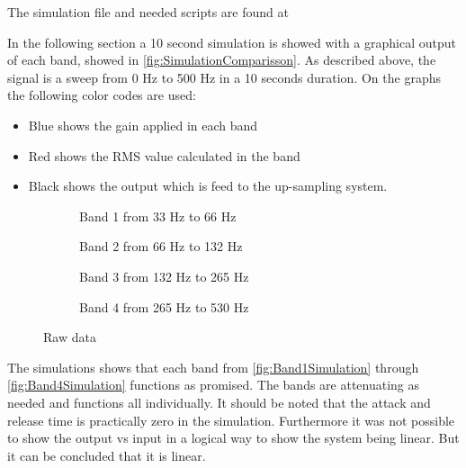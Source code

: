 The simulation file and needed scripts are found at 



In the following section a 10 second simulation is showed with a graphical output of each band, showed in \autoref{fig:SimulationComparisson}. As described above, the signal is a sweep from 0 Hz to 500 Hz in a 10 seconds duration. On the graphs the following color codes are used:
\begin{itemize}
\item Blue shows the gain applied in each band
\item Red shows the RMS value calculated in the band
\item Black shows the output which is feed to the up-sampling system.
\end{itemize}

\begin{figure}[H]
\centering
\begin{subfigure}[t]{0.49\textwidth}
    \centering
    
    \caption{Band 1 from 33 Hz to 66 Hz}
    \label{fig:Band1Simulation}
\end{subfigure}
\begin{subfigure}[t]{0.49\textwidth}
    \centering
    
    \caption{Band 2 from 66 Hz to 132 Hz}
    \label{fig:Band2Simulation}
\end{subfigure}
\begin{subfigure}[t]{0.49\textwidth}
    \centering
    
    \caption{Band 3 from 132 Hz to 265 Hz}
    \label{fig:Band3Simulation}
\end{subfigure}
\begin{subfigure}[t]{0.49\textwidth}
    \centering
    
    \caption{Band 4 from 265 Hz to 530 Hz}
    \label{fig:Band4Simulation}
\end{subfigure}
\caption{Raw data}
\label{fig:SimulationComparisson}
\end{figure} 

The simulations shows that each band from \autoref{fig:Band1Simulation} through \autoref{fig:Band4Simulation} functions as promised. The bands are attenuating as needed and functions all individually. It should be noted that the attack and release time is practically zero in the simulation. Furthermore it was not possible to show the output vs input in a logical way to show the system being linear. But it can be concluded that it is linear.

 




